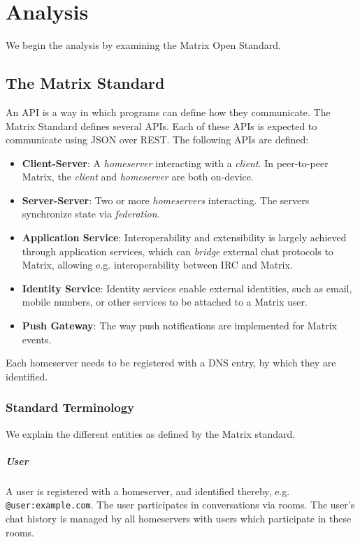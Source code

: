     \chapter{Analysis}
We begin the analysis by examining the Matrix Open Standard.

\section{The Matrix Standard}
An \ac{API} is a way in which programs can define how they communicate.
The Matrix Standard defines several \ac{API}s.
Each of these \ac{API}s is expected to communicate using \ac{JSON} over \ac{REST}.
The following \ac{API}s are defined\cite{matrix_org_spec}:
\begin{itemize}
    \item \textbf{Client-Server}: A \textit{homeserver} interacting with a \textit{client}. In peer-to-peer Matrix, the \textit{client} and \textit{homeserver} are both on-device.
    \item \textbf{Server-Server}: Two or more \textit{homeservers} interacting. The servers synchronize state via \textit{federation}.
    \item \textbf{Application Service}: Interoperability and extensibility is largely achieved through application services, which can \textit{bridge} external chat protocols to Matrix, allowing e.g. interoperability between \ac{IRC} and Matrix.
    \item \textbf{Identity Service}: Identity services enable external identities, such as email, mobile numbers, or other services to be attached to a Matrix user.
    \item \textbf{Push Gateway}: The way push notifications are implemented for Matrix events.
\end{itemize}

Each homeserver needs to be registered with a \ac{DNS} entry, by which they are identified.


\subsection{Standard Terminology}
We explain the different entities as defined by the Matrix standard.

\paragraph{User}
A user is registered with a homeserver, and identified thereby, e.g. \texttt{@user:example.com}.
The user participates in conversations via rooms.
The user's chat history is managed by all homeservers with users which participate in these rooms.

